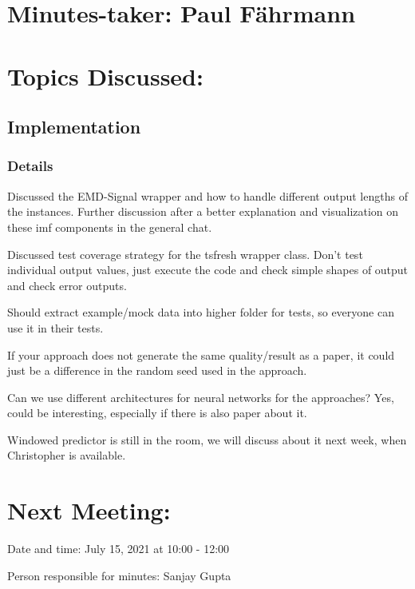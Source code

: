 \documentclass[11pt]{meetingmins} %
\begin{document}
\maketitle

\section{Minutes-taker: Paul Fährmann}

\section{Topics Discussed:}

\subsection{Implementation}
\subsubsection{Details}
\begin{hiddensubitems}
    \item Discussed the EMD-Signal wrapper and how to handle different output lengths of the instances. Further discussion after a better explanation and visualization on these imf components in the general chat.
    \item Discussed test coverage strategy for the tsfresh wrapper class. Don't test individual output values, just execute the code and check simple shapes of output and check error outputs.
    \item Should extract example/mock data into higher folder for tests, so everyone can use it in their tests.
    \item If your approach does not generate the same quality/result as a paper, it could just be a difference in the random seed used in the approach.
    \item Can we use different architectures for neural networks for the approaches? Yes, could be interesting, especially if there is also paper about it.
    \item Windowed predictor is still in the room, we will discuss about it next week, when Christopher is available.
\end{hiddensubitems}

\section{Next Meeting:}
\begin{hiddensubitems}
    \item Date and time: July 15, 2021 at 10:00 - 12:00
    \item Person responsible for minutes: Sanjay Gupta
\end{hiddensubitems}
\end{document}
